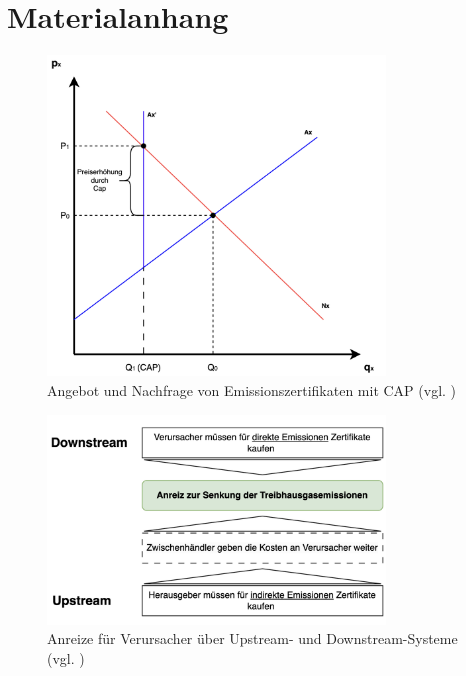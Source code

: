 \chapter{Materialanhang}

\begin{figure}[ht]
	\centering
	\includegraphics[width=0.8\textwidth]{Bilder/supply_demand_ets.png} 
	\caption{Angebot und Nachfrage von Emissionszertifikaten mit CAP (vgl. \cite{pettinger.2017})}
	\label{fig:supply_demand_ets}
\end{figure}

\begin{figure}[ht]
	\centering
	\includegraphics[width=0.8\textwidth]{Bilder/up_and_downstream_ets.png} 
	\caption{Anreize für Verursacher über Upstream- und Downstream-Systeme (vgl. \cite{dehst.2023})}
	\label{fig:up_and_downstream_ets}
\end{figure}

